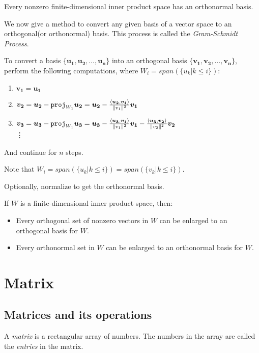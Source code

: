 \documentclass{report}
\begin{document}
		\begin{thm}
			Every nonzero finite-dimensional inner product space has an orthonormal basis.
		\end{thm}
		
		We now give a method to convert any given basis of a vector space to an orthogonal(or orthonormal) basis. This process is called the \emph{Gram-Schmidt Process}.
		
		\begin{mthd}
			To convert a basis $\{\bm{u_1},\bm{u_2},\dots,\bm{u_n}\}$ into an orthogonal basis $\{\bm{v_1},\bm{v_2},\dots,\bm{v_n}\}$, perform the following computations, where $W_i=span(\{u_k|k \le i\})$:
			\begin{enumerate}
				\item $\bm{v_1}=\bm{u_1}$
				\item $\bm{v_2}=\bm{u_2}-\verb|proj|_{W_1}\bm{u_2}=\bm{u_2}-\frac{\left<\bm{u_2},\bm{v_1}\right>}{\|v_1\|^2}\bm{v_1}$
				\item $\bm{v_3}=\bm{u_3}-\verb|proj|_{W_1}\bm{u_3}=\bm{u_3}-\frac{\left<\bm{u_3},\bm{v_1}\right>}{\|v_1\|^2}\bm{v_1}-\frac{\left<\bm{u_3},\bm{v_2}\right>}{\|v_2\|^2}\bm{v_2}$
				\\ \vdots
			\end{enumerate}
			
			And continue for $n$ steps.
			
			Note that $W_i=span(\{u_k|k \le i\})=span(\{v_k|k \le i\})$.
			
			Optionally, normalize to get the orthonormal basis.
		\end{mthd}
		
		\begin{thm}
			If $W$ is a finite-dimensional inner product space, then:
			\begin{itemize}
				\item Every orthogonal set of nonzero vectors in $W$ can be enlarged to an orthogonal basis for $W$.
				\item Every orthonormal set in $W$ can be enlarged to an orthonormal basis for $W$.
			\end{itemize}
		\end{thm}
	
	\section{Matrix}
		\subsection{Matrices and its operations}
			\begin{defn}[Matrix]
				A \emph{matrix} is a rectangular array of numbers. The numbers in the array are called the \emph{entries} in the matrix.
			\end{defn}
		
\end{document}
